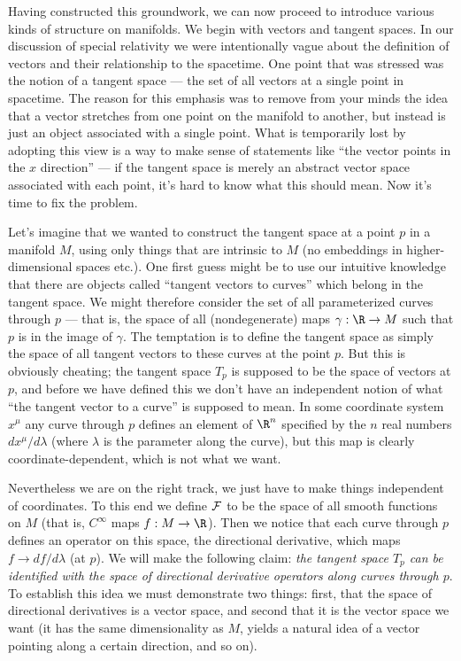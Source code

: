 \documentclass[12pt]{article}
\begin{document}
Having constructed this groundwork, we can now proceed to introduce
various kinds of structure on manifolds.  We begin with vectors and
tangent spaces.  In our discussion of special relativity we were
intentionally vague about the definition of vectors and their 
relationship to the spacetime.  One point that was stressed was the
notion of a tangent space --- the set of all vectors at a single
point in spacetime.  The reason for this emphasis was to remove from
your minds the idea that a vector stretches from one point on the
manifold to another, but instead is just an object associated with
a single point.  What is temporarily lost by adopting this view is
a way to make sense of statements like ``the vector points in the
$x$ direction'' --- if the tangent space is merely an abstract vector
space associated with each point, it's hard to know what this should
mean.  Now it's time to fix the problem.

Let's imagine that we wanted to construct the tangent space at a
point $p$ in a manifold $M$, using only things that are intrinsic
to $M$ (no embeddings in higher-dimensional spaces etc.).  One first
guess might be to use our intuitive knowledge that  there are
objects called ``tangent vectors to curves'' which
belong in the tangent space.  We might therefore consider the set
of all parameterized curves through $p$ --- that is,
the space of all (nondegenerate) maps $\gamma:\R\rightarrow M$ such
that $p$ is in the image of $\gamma$.  The temptation is to define
the tangent space as simply the space of all tangent vectors to
these curves at the point $p$.  But this is obviously cheating; the
tangent space $T_p$ is supposed to be the space of vectors at $p$,
and before we have defined this we don't have an independent notion
of what ``the tangent vector to a curve'' is supposed to mean.  In
some coordinate system $x^\mu$ any curve through $p$ defines an
element of $\R^n$ specified by the $n$ real numbers
$dx^\mu/d\lambda$ (where $\lambda$ is the parameter along the curve),
but this map is clearly coordinate-dependent, which is not what we
want.  

Nevertheless we are on the right track, we just have to make things
independent of coordinates.  To this end we define ${\cal F}$ to be
the space of all smooth functions on $M$ (that is, $C^\infty$ maps
$f:M\rightarrow \R$).  Then we notice that each curve through $p$
defines an operator on this space, the directional derivative, which
maps $f\rightarrow df/d\lambda$ (at $p$).  We will make the following
claim: {\it the tangent space $T_p$ can be identified with the space
of directional derivative operators along curves through $p$}.  To
establish this idea we must demonstrate two things: first, that the
space of directional derivatives is a vector space, and second that
it is the vector space we want (it has the same dimensionality as $M$, 
yields a natural idea of a vector pointing along a certain direction, 
and so on).
\end{document}
